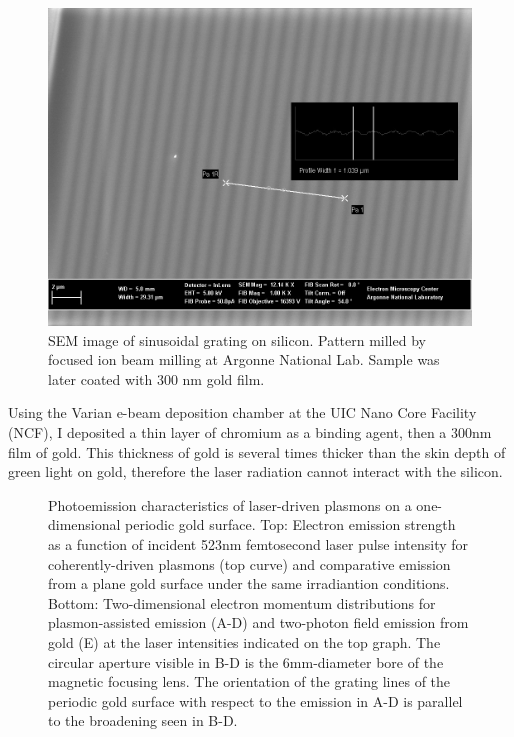 \begin{figure}
  \centering
  \includegraphics{HighMagSEM.jpg}
  \caption{
    SEM image of sinusoidal grating on silicon.
    Pattern milled by focused ion beam milling at Argonne National Lab.
    Sample was later coated with 300 nm gold film.
  }
  \label{fig:fib-si-sem}
\end{figure}

Using the Varian e-beam deposition chamber at the UIC Nano Core Facility (NCF), I deposited a thin layer of chromium as a binding agent, then a 300nm film of gold.
This thickness of gold is several times thicker than the skin depth of green light on gold, therefore the laser radiation cannot interact with the silicon.

\begin{figure}
  \centering
  
  \caption{
    Photoemission characteristics of laser-driven plasmons on a one-dimensional periodic gold surface.
    Top: Electron emission strength as a function of incident 523nm femtosecond laser pulse intensity for coherently-driven plasmons (top curve)
      and comparative emission from a plane gold surface under the same irradiantion conditions.
    Bottom: Two-dimensional electron momentum distributions for plasmon-assisted emission (A-D) and two-photon field emission from gold (E) at the laser intensities indicated on the top graph.
    The circular aperture visible in B-D is the 6mm-diameter bore of the magnetic focusing lens.
    The orientation of the grating lines of the periodic gold surface with respect to the emission in A-D is parallel to the broadening seen in B-D.
  }
  \label{fig:pape}
\end{figure}

